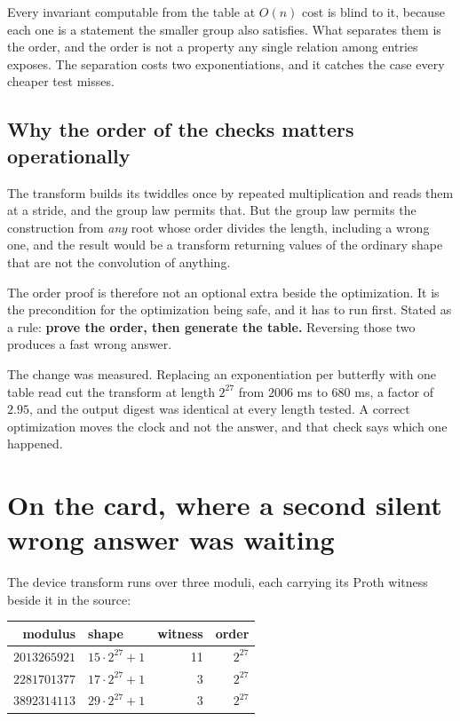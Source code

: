 \documentclass{article}
\begin{document}
Every invariant computable from the table at \(O(n)\) cost is blind to it, because each one is a statement the smaller group also satisfies. What separates them is the order, and the order is not a property any single relation among entries exposes. The separation costs two exponentiations, and it catches the case every cheaper test misses.

\subsection{Why the order of the checks matters operationally}

The transform builds its twiddles once by repeated multiplication and reads them at a stride, and the group law permits that. But the group law permits the construction from \emph{any} root whose order divides the length, including a wrong one, and the result would be a transform returning values of the ordinary shape that are not the convolution of anything.

The order proof is therefore not an optional extra beside the optimization. It is the precondition for the optimization being safe, and it has to run first. Stated as a rule: \textbf{prove the order, then generate the table.} Reversing those two produces a fast wrong answer.

The change was measured. Replacing an exponentiation per butterfly with one table read cut the transform at length \(2^{27}\) from \(2006\) ms to \(680\) ms, a factor of \(2.95\), and the output digest was identical at every length tested. A correct optimization moves the clock and not the answer, and that check says which one happened.

\section{On the card, where a second silent wrong answer was waiting}

The device transform runs over three moduli, each carrying its Proth witness beside it in the source:

\begin{center}
\begin{tabular}{@{}rlrr@{}}
\toprule
modulus & shape & witness & order \\
\midrule
\(2013265921\) & \(15 \cdot 2^{27} + 1\) & 11 & \(2^{27}\) \\
\(2281701377\) & \(17 \cdot 2^{27} + 1\) & 3 & \(2^{27}\) \\
\(3892314113\) & \(29 \cdot 2^{27} + 1\) & 3 & \(2^{27}\) \\
\bottomrule
\end{tabular}
\end{center}
\end{document}
